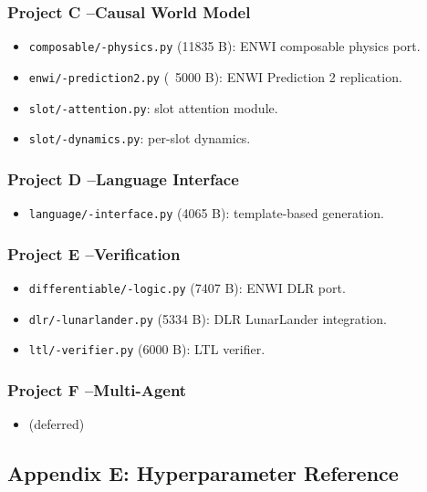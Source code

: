 \documentclass[11pt]{article}
\begin{document}
\subsubsection{Project C --Causal World Model}

\begin{itemize}
  \item \texttt{composable/-physics.py} (11835 B): ENWI composable physics port.
  \item \texttt{enwi/-prediction2.py} (~5000 B): ENWI Prediction 2 replication.
  \item \texttt{slot/-attention.py}: slot attention module.
  \item \texttt{slot/-dynamics.py}: per-slot dynamics.
\end{itemize}


\subsubsection{Project D --Language Interface}

\begin{itemize}
  \item \texttt{language/-interface.py} (4065 B): template-based generation.
\end{itemize}


\subsubsection{Project E --Verification}

\begin{itemize}
  \item \texttt{differentiable/-logic.py} (7407 B): ENWI DLR port.
  \item \texttt{dlr/-lunarlander.py} (5334 B): DLR LunarLander integration.
  \item \texttt{ltl/-verifier.py} (6000 B): LTL verifier.
\end{itemize}


\subsubsection{Project F --Multi-Agent}

\begin{itemize}
  \item (deferred)
\end{itemize}


\hrulefill

\subsection{Appendix E: Hyperparameter Reference}
\end{document}

